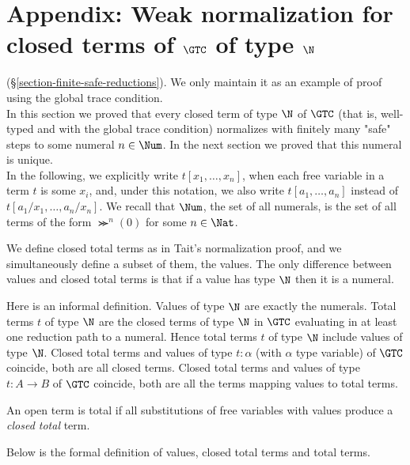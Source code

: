 \section{Appendix: Weak normalization for closed terms of $\GTC$ of type $\N$}
\label{section-weak-normalization}
(\S \ref{section-finite-safe-reductions}). We only maintain
it as an example of proof using the global trace condition.
\\



In this section we proved that every closed term of type $\N$ of $\GTC$
 (that is, well-typed and with the global trace condition) normalizes with finitely many "safe" steps
to some numeral $n \in \Num$. In the next section we proved that this numeral is unique.
\\

In the following, we explicitly write $t[x_1,\ldots,x_n]$,
when each free variable in  a term $t$ is some $x_i$, 
and, under this notation, we also write $t[a_1,\ldots,a_n]$ instead of $t[a_1/x_1,\ldots,a_n/x_n]$. 
We recall that $\Num$, the set of all numerals, is the set of all terms of the form
$\Succ^n(0)$ for some $n\in \Nat$.

We define closed total terms as in Tait's normalization proof, and we simultaneously 
define a subset of them, the values.
The only difference between values and closed total terms 
is that if a value has type $\N$ then it is a numeral.

Here is an informal definition. Values of type $\N$ are exactly the numerals. 
Total terms $t$ of type $\N$ are
the closed terms of type $\N$ in $\GTC$ evaluating in at least one reduction path to a numeral. 
Hence total terms $t$ of type $\N$ include values of type $\N$. 
Closed total terms and values of type $t:\alpha$ (with $\alpha$ type variable) of $\GTC$ coincide, 
both are all closed terms.
Closed total terms and values of type $t:A \rightarrow B$ of $\GTC$ coincide, 
both are all the terms mapping values to total terms. 

An open term is total if all substitutions of free variables with values produce a \emph{closed total} term.

Below is the formal definition of values, closed total terms and total terms.

